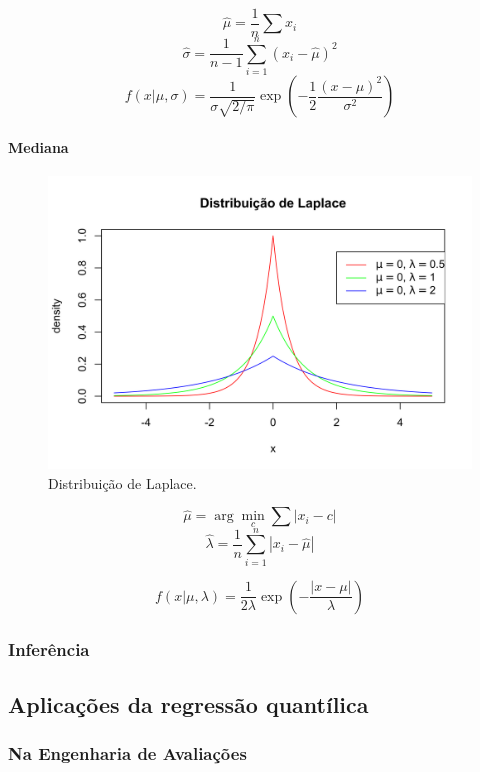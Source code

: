 \documentclass[a4paper, 12pt]{article}
\let\oldparagraph\paragraph
\renewcommand{\paragraph}[1]{\oldparagraph{#1}\mbox{}}
\begin{document}
\[\hat \mu = \frac{1}{n}\sum x_i\]
\[\hat \sigma = \frac{1}{n-1} \sum_{i=1}^n (x_i - \hat \mu)^2\]
\[f(x|\mu, \sigma) = \frac{1}{\sigma\sqrt{2/\pi}}\exp \left (-\frac{1}{2}\frac{(x - \mu)^2}{\sigma^2} \right )\]

\hypertarget{mediana}{%
\paragraph{Mediana}\label{mediana}}

\begin{figure}[H]

{\centering \includegraphics[width=0.7\linewidth]{images/dist_Laplace-1} 

}

\caption{Distribuição de Laplace.}\label{fig:dist_Laplace}
\end{figure}

\[\hat \mu = \arg\min_c \sum |x_i - c|\]
\[\hat \lambda = \frac{1}{n} \sum_{i=1}^n |x_i - \hat \mu|\]

\[f(x|\mu, \lambda) = \frac{1}{2 \lambda} \exp \left ( -\frac{|x - \mu|}{\lambda}\right )\]

\hypertarget{inferencia}{%
\subsubsection{Inferência}\label{inferencia}}

\hypertarget{aplicacoes-da-regressao-quantilica}{%
\subsection{Aplicações da regressão
quantílica}\label{aplicacoes-da-regressao-quantilica}}

\hypertarget{na-engenharia-de-avaliacoes}{%
\subsubsection{Na Engenharia de
Avaliações}\label{na-engenharia-de-avaliacoes}}
\end{document}
